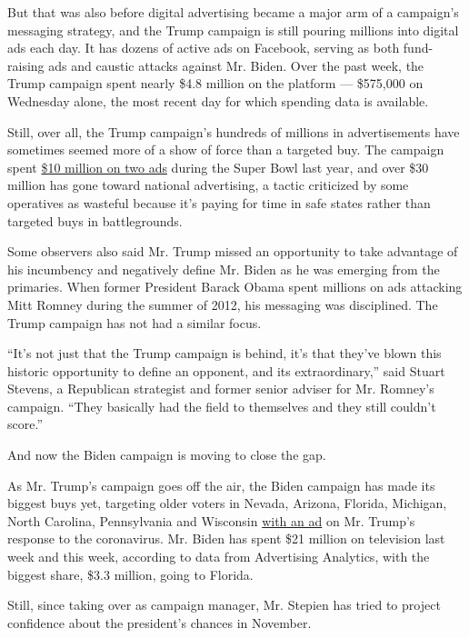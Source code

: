 But that was also before digital advertising became a major arm of a
campaign's messaging strategy, and the Trump campaign is still pouring
millions into digital ads each day. It has dozens of active ads on
Facebook, serving as both fund-raising ads and caustic attacks against
Mr. Biden. Over the past week, the Trump campaign spent nearly \$4.8
million on the platform --- \$575,000 on Wednesday alone, the most
recent day for which spending data is available.

Still, over all, the Trump campaign's hundreds of millions in
advertisements have sometimes seemed more of a show of force than a
targeted buy. The campaign spent
\href{https://www.nytimes.com/2020/01/07/us/politics/bloomberg-trump-super-bowl-ad.html}{\$10
million on two ads} during the Super Bowl last year, and over \$30
million has gone toward national advertising, a tactic criticized by
some operatives as wasteful because it's paying for time in safe states
rather than targeted buys in battlegrounds.

Some observers also said Mr. Trump missed an opportunity to take
advantage of his incumbency and negatively define Mr. Biden as he was
emerging from the primaries. When former President Barack Obama spent
millions on ads attacking Mitt Romney during the summer of 2012, his
messaging was disciplined. The Trump campaign has not had a similar
focus.

``It's not just that the Trump campaign is behind, it's that they've
blown this historic opportunity to define an opponent, and its
extraordinary,'' said Stuart Stevens, a Republican strategist and former
senior adviser for Mr. Romney's campaign. ``They basically had the field
to themselves and they still couldn't score.''

And now the Biden campaign is moving to close the gap.

As Mr. Trump's campaign goes off the air, the Biden campaign has made
its biggest buys yet, targeting older voters in Nevada, Arizona,
Florida, Michigan, North Carolina, Pennsylvania and Wisconsin
\href{https://www.youtube.com/watch?v=FxT0IFdaaQc\&feature=youtu.be}{with
an ad} on Mr. Trump's response to the coronavirus. Mr. Biden has spent
\$21 million on television last week and this week, according to data
from Advertising Analytics, with the biggest share, \$3.3 million, going
to Florida.

Still, since taking over as campaign manager, Mr. Stepien has tried to
project confidence about the president's chances in November.

